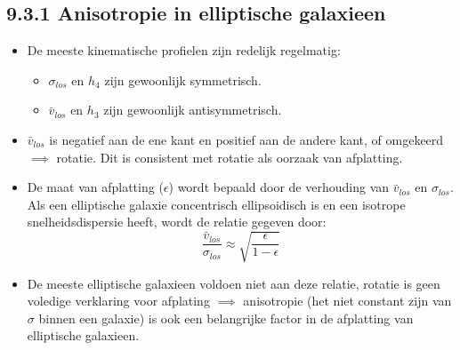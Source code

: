 \documentclass[10pt,a4paper]{article}
\begin{document}
\subsection*{9.3.1 Anisotropie in elliptische galaxieen}
\begin{itemize}
\item De meeste kinematische profielen zijn redelijk regelmatig:
\begin{itemize}
  \item $\sigma_{los}$ en $h_4$ zijn gewoonlijk symmetrisch.
  \item $\bar{v}_{los}$ en $h_3$ zijn gewoonlijk antisymmetrisch.
\end{itemize}
\item $\bar{v}_{los}$ is negatief aan de ene kant en positief aan de andere kant, of omgekeerd $\implies$ rotatie. Dit is consistent met rotatie als oorzaak van afplatting.
\item De maat van afplatting ($\epsilon$) wordt bepaald door de verhouding van $\bar{v}_{los}$ en $\sigma_{los}$. Als een elliptische galaxie concentrisch ellipsoidisch is en een isotrope snelheidsdispersie heeft, wordt de relatie gegeven door:
\[
\frac{\bar{v}_{los}}{\sigma_{los}}\approx\sqrt{\frac{\epsilon}{1-\epsilon}}
\]  
\item De meeste elliptische galaxieen voldoen niet aan deze relatie, rotatie is geen voledige verklaring voor afplating $\implies$ anisotropie (het niet constant zijn van $\sigma$ binnen een galaxie) is ook een belangrijke factor in de afplatting van elliptische galaxieen.
\end{itemize}
\end{document}
